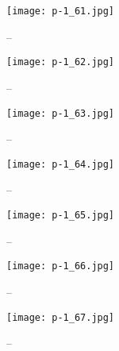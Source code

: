 \clearpage


\begin{figure}
    \begin{center}
        \texttt{[image: p-1\_61.jpg]}
        \caption{--}
    \end{center}
\end{figure}

\clearpage


\begin{figure}
    \begin{center}
        \texttt{[image: p-1\_62.jpg]}
        \caption{--}
    \end{center}
\end{figure}

\clearpage


\begin{figure}
    \begin{center}
        \texttt{[image: p-1\_63.jpg]}
        \caption{--}
    \end{center}
\end{figure}

\clearpage


\begin{figure}
    \begin{center}
        \texttt{[image: p-1\_64.jpg]}
        \caption{--}
    \end{center}
\end{figure}

\clearpage


\begin{figure}
    \begin{center}
        \texttt{[image: p-1\_65.jpg]}
        \caption{--}
    \end{center}
\end{figure}

\clearpage


\begin{figure}
    \begin{center}
        \texttt{[image: p-1\_66.jpg]}
        \caption{--}
    \end{center}
\end{figure}

\clearpage


\begin{figure}
    \begin{center}
        \texttt{[image: p-1\_67.jpg]}
        \caption{--}
    \end{center}
\end{figure}

